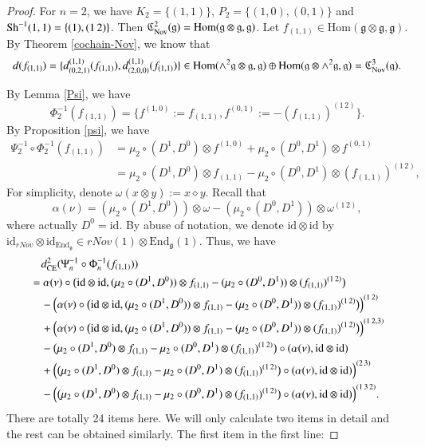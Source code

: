 \documentclass[12pt]{amsart}
\theoremstyle{definition}
\newcommand{\g}{\mathfrak g}
\newcommand{\frkC}{\mathfrak C}
\newcommand{\id}{\mathrm{id}}
\newcommand{\Hom}{\mathrm{Hom}}
\newcommand{\End}{\mathrm{End}}
\newcommand{\ot}{\otimes}
\newcommand{\Sh}{{\rm Sh}}
\newcommand{\ce}{{\rm CE}}
\newcommand{\ff}{f_{(1,1)}}
\newcommand{\nov}{{\rm Nov}}
\begin{document}
\begin{proof}
	For $n=2$, we have $K_2=\{(1,1)\}$, $P_2=\{(1,0),(0,1)\}$ and $\Sh^{-1}(1,1)=\{(1),(1\,2)\}$. Then $\frkC_{\nov}^2(\g)=\Hom(\g\ot\g,\g)$. Let $f_{(1,1)}\in \Hom(\g\ot\g,\g)$.
 By Theorem \ref{cochain-Nov}, we know that
$$
d(\ff)=\{d_{(0,2,1)}^{(1,1)}(f_{(1,1)}),d_{(2,0,0)}^{(1,1)}(f_{(1,1)})\}\in \Hom(\wedge^2\g\ot\g,\g)\oplus\Hom(\g\ot\wedge^2\g,\g)=\frkC_{\nov}^3(\g).
$$


 By Lemma \ref{Psi}, we have
$$
\Phi_{2}^{-1}(f_{(1,1)})=\{f^{(1,0)}:=f_{(1,1)},f^{(0,1)}:=-(f_{(1,1)})^{(1\,2)}\}.
$$
 By Proposition \ref{psi}, we have
\begin{align*}
	\Psi_2^{-1}\circ\Phi_{2}^{-1}(f_{(1,1)})&=\mu_2\circ(D^1,D^0)\ot f^{(1,0)}+\mu_2\circ(D^0,D^1)\ot f^{(0,1)}\\
	&=\mu_2\circ(D^1,D^0)\ot f_{(1,1)}-\mu_2\circ(D^0,D^1)\ot (f_{(1,1)})^{(1\,2)},
\end{align*}
For simplicity, denote $\omega(x\ot y):=x\diamond y$. Recall that
$$
\alpha(\nu)=(\mu_2\circ(D^1,D^0))\ot \omega-(\mu_2\circ(D^0,D^1))\ot \omega^{(1\,2)},
$$
where actually $D^0=\id$. By abuse of notation, we denote $\id\ot\id$ by $\id_{rNov}\ot\id_{\End_\g}\in rNov(1)\ot \End_\g(1)$.  Thus, we have
\begin{align*}
	&\quad d_\ce^2(\Psi_n^{-1}\circ\Phi_{n}^{-1}(f_{(1,1)}))\\
	&=\alpha(\nu)\circ\bigl(\id\ot \id,(\mu_2\circ(D^1,D^0))\ot f_{(1,1)}-(\mu_2\circ(D^0,D^1))\ot (f_{(1,1)})^{(1\,2)}\bigr)\\
	&\quad -\Big(\alpha(\nu)\circ\bigl(\id\ot \id,(\mu_2\circ(D^1,D^0))\ot f_{(1,1)}-(\mu_2\circ(D^0,D^1))\ot (f_{(1,1)})^{(1\,2)}\bigr)\Big)^{(1\,2)}\\
	&\quad +\Big(\alpha(\nu)\circ\bigl(\id\ot \id,(\mu_2\circ(D^1,D^0))\ot f_{(1,1)}-(\mu_2\circ(D^0,D^1))\ot (f_{(1,1)})^{(1\,2)}\bigr)\Big)^{(1\,2,3)}\\
	&\quad -\bigl(\mu_2\circ(D^1,D^0)\ot f_{(1,1)}-\mu_2\circ(D^0,D^1)\ot (f_{(1,1)})^{(1\,2)}\bigr)\circ (\alpha(\nu),\id\ot\id)\\
	&\quad +\Big(\bigl(\mu_2\circ(D^1,D^0)\ot f_{(1,1)}-\mu_2\circ(D^0,D^1)\ot (f_{(1,1)})^{(1\,2)}\bigr)\circ (\alpha(\nu),\id\ot\id)\Big)^{(2\,3)}\\
	&\quad -\Big(\bigl(\mu_2\circ(D^1,D^0)\ot f_{(1,1)}-\mu_2\circ(D^0,D^1)\ot (f_{(1,1)})^{(1\,2)}\bigr)\circ (\alpha(\nu),\id\ot\id)\Big)^{(1\,3\,2)}.
\end{align*}
There are totally 24 items here. We will only calculate two items in detail and the rest can be obtained similarly. The first item in the first line:

\end{proof}
\end{document}
